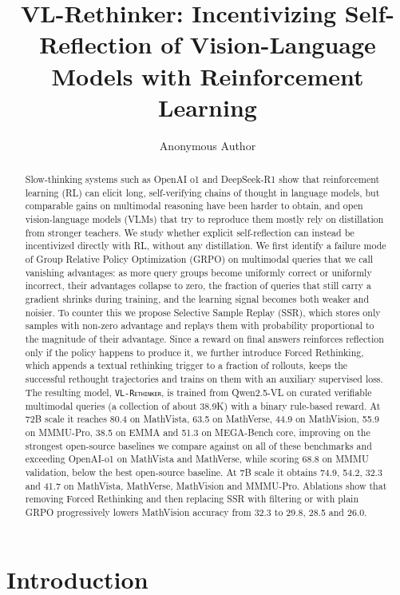 \documentclass{article}
\title{VL-Rethinker: Incentivizing Self-Reflection of Vision-Language Models with Reinforcement Learning}
\author{Anonymous Author}
\newcommand{\model}{\texttt{\textsc{VL-Rethinker}}\xspace}
\begin{document}
\maketitle

\begin{abstract}
Slow-thinking systems such as OpenAI o1 and DeepSeek-R1 show that reinforcement learning (RL) can elicit long, self-verifying chains of thought in language models, but comparable gains on multimodal reasoning have been harder to obtain, and open vision-language models (VLMs) that try to reproduce them mostly rely on distillation from stronger teachers. We study whether explicit self-reflection can instead be incentivized directly with RL, without any distillation. We first identify a failure mode of Group Relative Policy Optimization (GRPO) on multimodal queries that we call vanishing advantages: as more query groups become uniformly correct or uniformly incorrect, their advantages collapse to zero, the fraction of queries that still carry a gradient shrinks during training, and the learning signal becomes both weaker and noisier. To counter this we propose Selective Sample Replay (SSR), which stores only samples with non-zero advantage and replays them with probability proportional to the magnitude of their advantage. Since a reward on final answers reinforces reflection only if the policy happens to produce it, we further introduce Forced Rethinking, which appends a textual rethinking trigger to a fraction of rollouts, keeps the successful rethought trajectories and trains on them with an auxiliary supervised loss. The resulting model, \model, is trained from Qwen2.5-VL on curated verifiable multimodal queries (a collection of about 38.9K) with a binary rule-based reward. At 72B scale it reaches 80.4 on MathVista, 63.5 on MathVerse, 44.9 on MathVision, 55.9 on MMMU-Pro, 38.5 on EMMA and 51.3 on MEGA-Bench core, improving on the strongest open-source baselines we compare against on all of these benchmarks and exceeding OpenAI-o1 on MathVista and MathVerse, while scoring 68.8 on MMMU validation, below the best open-source baseline. At 7B scale it obtains 74.9, 54.2, 32.3 and 41.7 on MathVista, MathVerse, MathVision and MMMU-Pro. Ablations show that removing Forced Rethinking and then replacing SSR with filtering or with plain GRPO progressively lowers MathVision accuracy from 32.3 to 29.8, 28.5 and 26.0.
\end{abstract}

\section{Introduction}
\label{sec:intro}
\end{document}
